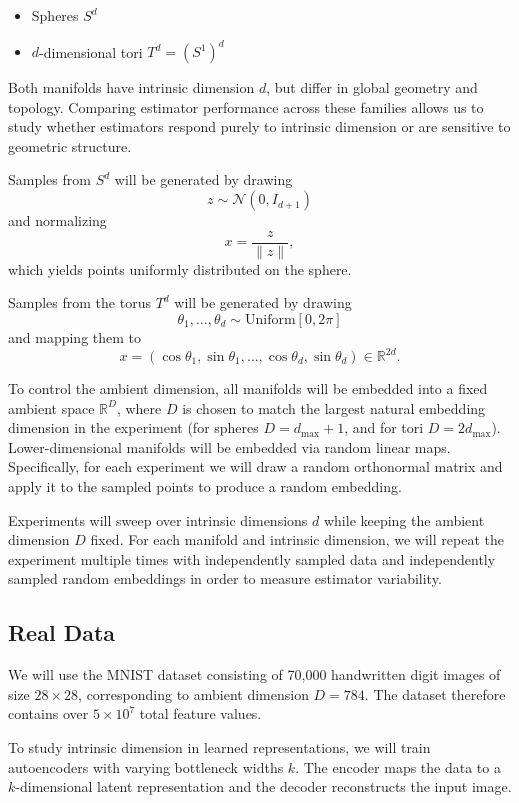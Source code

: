 \documentclass[11pt]{article}
\begin{document}
\begin{itemize}
\item Spheres $S^d$
\item $d$-dimensional tori $T^d = (S^1)^d$
\end{itemize}

Both manifolds have intrinsic dimension $d$, but differ in global geometry and topology. 
Comparing estimator performance across these families allows us to study whether estimators respond purely to intrinsic dimension or are sensitive to geometric structure.

Samples from $S^d$ will be generated by drawing
\[
z \sim \mathcal{N}(0, I_{d+1})
\]
and normalizing
\[
x = \frac{z}{\|z\|},
\]
which yields points uniformly distributed on the sphere.

Samples from the torus $T^d$ will be generated by drawing
\[
\theta_1,\dots,\theta_d \sim \mathrm{Uniform}[0,2\pi]
\]
and mapping them to
\[
x = (\cos\theta_1,\sin\theta_1,\dots,\cos\theta_d,\sin\theta_d)
\in \mathbb{R}^{2d}.
\]

To control the ambient dimension, all manifolds will be embedded into a fixed ambient space $\mathbb{R}^D$, where $D$ is chosen to match the largest natural embedding dimension in the experiment (for spheres $D = d_\text{max} +1$, and for tori $D=2d_{\max}$). Lower-dimensional manifolds will be embedded via random linear maps. Specifically, for each experiment we will draw a random orthonormal matrix and apply it to the sampled points to produce a random embedding.

Experiments will sweep over intrinsic dimensions $d$ while keeping the ambient dimension $D$ fixed. For each manifold and intrinsic dimension, we will repeat the experiment multiple times with independently sampled data and independently sampled random embeddings in order to measure estimator variability.

\subsection*{Real Data}

We will use the MNIST dataset consisting of 70,000 handwritten digit images of size $28\times28$, corresponding to ambient dimension $D=784$. The dataset therefore contains over $5\times10^7$ total feature values.

To study intrinsic dimension in learned representations, we will train autoencoders with varying bottleneck widths $k$. The encoder maps the data to a $k$-dimensional latent representation and the decoder reconstructs the input image.
\end{document}
